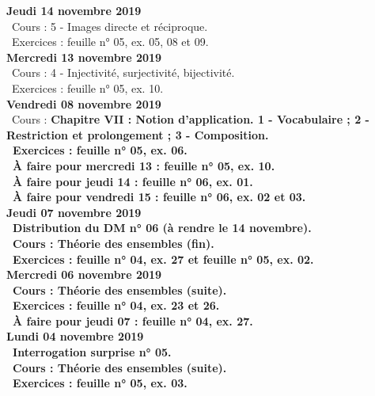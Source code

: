 \documentclass[12pt,a4paper]{article}
\begin{document}
\noindent\textbf{Jeudi 14 novembre 2019}\\
\bu\ Cours : 5 - Images directe et réciproque.\\
\bu\ Exercices : feuille n° 05, ex. 05, 08 et 09.\vspace{.4cm}\\

\noindent\textbf{Mercredi 13 novembre 2019}\\
\bu\ Cours : 4 - Injectivité, surjectivité, bijectivité.\\
\bu\ Exercices : feuille n° 05, ex. 10.\vspace{.4cm}\\

\noindent\textbf{Vendredi 08 novembre 2019}\\
\bu\ Cours : \bf Chapitre VII \rm : Notion d'application. 1 - Vocabulaire ; 2 - Restriction et prolongement ; 3 - Composition.\\
\bu\ Exercices : feuille n° 05, ex. 06.\\
\bu\ À faire pour mercredi 13 : feuille n° 05, ex. 10.\\
\bu\ À faire pour jeudi 14 : feuille n° 06, ex. 01.\\
\bu\ À faire pour vendredi 15 : feuille n° 06, ex. 02 et 03.\vspace{.4cm}\\

\noindent\textbf{Jeudi 07 novembre 2019}\\
\bu\ Distribution du DM n° 06 (à rendre le 14 novembre).\\
\bu\ Cours : Théorie des ensembles (fin).\\
\bu\ Exercices : feuille n° 04, ex. 27 et feuille n° 05, ex. 02.\vspace{.4cm}\\

\noindent\textbf{\bf Mercredi 06 novembre 2019}\\
\bu\ Cours : Théorie des ensembles (suite).\\
\bu\ Exercices : feuille n° 04, ex. 23 et 26.\\
\bu\ À faire pour jeudi 07 : feuille n° 04, ex. 27.\vspace{.4cm}\\
 
\noindent\textbf{Lundi 04 novembre 2019}\\
\bu\ Interrogation surprise n° 05.\\
\bu\ Cours : Théorie des ensembles (suite).\\
\bu\ Exercices : feuille n° 05, ex. 03.\vspace{.4cm}\\
 
\end{document}
